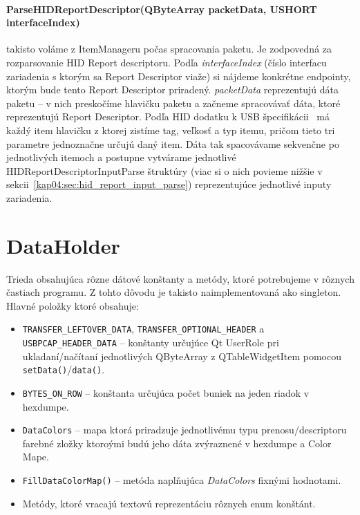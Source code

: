 \paragraph{ParseHIDReportDescriptor(QByteArray packetData, USHORT interfaceIndex)} \label{kap04:sec:parse_hid} takisto voláme z ItemManageru počas spracovania paketu. Je zodpovedná za rozparsovanie HID Report descriptoru. Podľa \textit{interfaceIndex} (číslo interfacu zariadenia s ktorým sa Report Descriptor viaže) si nájdeme konkrétne endpointy, ktorým bude tento Report Descriptor priradený. \textit{packetData} reprezentujú dáta paketu -- v nich preskočíme hlavičku paketu a začneme spracovávať dáta, ktoré reprezentujú Report Descriptor. Podľa HID dodatku k USB špecifikácii~\cite{usbhid} má každý item hlavičku z ktorej zistíme tag, veľkosť a typ itemu, pričom tieto tri parametre jednoznačne určujú daný item. Dáta tak spacovávame sekvenčne po jednotlivých itemoch a postupne vytvárame jednotlivé HIDReportDescriptorInputParse štruktúry (viac si o nich povieme nižšie v sekcii~\ref{kap04:sec:hid_report_input_parse}) reprezentujúce jednotlivé inputy zariadenia.

\section{DataHolder}
\label{kap04:sec:data_holder}
Trieda obsahujúca rôzne dátové konštanty a metódy, ktoré potrebujeme v rôznych častiach programu. Z tohto dôvodu je takisto naimplementovaná ako singleton. Hlavné položky ktoré obsahuje:
\begin{itemize}
\item \texttt{TRANSFER\_LEFTOVER\_DATA}, \texttt{TRANSFER\_OPTIONAL\_HEADER} a \newline \texttt{USBPCAP\_HEADER\_DATA} -- konštanty určujúce Qt UserRole pri ukladaní/\newline načítaní jednotlivých QByteArray z QTableWidgetItem pomocou \newline \texttt{setData()}/\texttt{data()}.
\item \texttt{BYTES\_ON\_ROW} -- konštanta určujúca počet buniek na jeden riadok v hexdumpe.
\item \texttt{DataColors} -- mapa ktorá priradzuje jednotlivému typu prenosu/descripto\-ru farebné zložky ktoroými budú jeho dáta zvýraznené v hexdumpe a Color Mape.
\item \texttt{FillDataColorMap()} -- metóda naplňujúca \textit{DataColors} fixnými hodnotami.
\item Metódy, ktoré vracajú textovú reprezentáciu rôznych enum konštánt.
\end{itemize}

